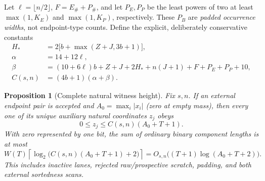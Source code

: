 \documentclass[11pt,a4paper]{article}
\numberwithin{equation}{section}
\newtheorem{proposition}[theorem]{Proposition}
\begin{document}
Let $\ell=\lfloor n/2\rfloor$, $F=E_\#+P_\#$, and let $P_E,P_P$ be the least powers of two at least $\max(1,K_E)$ and $\max(1,K_P)$, respectively. These $P_B$ are \emph{padded occurrence widths}, not endpoint-type counts. Define the explicit, deliberately conservative constants
\begin{align*}
H_*&=2\bigl[b+\max(Z+J,3b+1)\bigr],\\
\alpha&=14+12\ell,\\
\beta&=(10+6\ell)b+Z+J+2H_*+n(J+1)+F+P_E+P_P+10,\\
C(s,n)&=(4b+1)(\alpha+\beta).
\end{align*}
\begin{proposition}[Complete natural witness height]
Fix $s,n$. If an external endpoint pair is accepted and $A_0=\max_i|x_i|$ (zero at empty mass), then every one of its unique auxiliary natural coordinates $z_j$ obeys
\[
0\le z_j\le C(s,n)(A_0+T+1).
\]
With zero represented by one bit, the sum of ordinary binary component lengths is at most
\[
W(T)\left\lceil\log_2\bigl(C(s,n)(A_0+T+1)+2\bigr)\right\rceil
=O_{s,n}\bigl((T+1)\log(A_0+T+2)\bigr).
\]
This includes inactive lanes, rejected raw/prospective scratch, padding, and both external sortedness scans.
\end{proposition}
\end{document}

